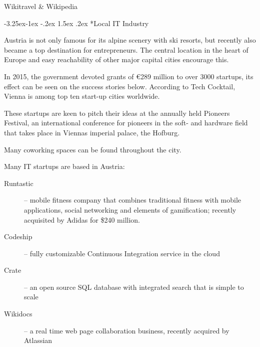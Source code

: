 \documentclass[10pt,a4paper]{article}
\makeatletter
\renewcommand\subsection{%
\@startsection{subsection}{2}{\z@}%
              {-3.25ex\@plus -1ex \@minus -.2ex}%
              {1.5ex \@plus .2ex}%
              {\color{kdelight}\sffamily\Large\bfseries}}
\makeatother
\begin{document}
\begin{flushright}Wikitravel \& Wikipedia\end{flushright}

\subsection*{Local IT Industry}
Austria is not only famous for its alpine scenery with ski resorts, but recently also became a top destination for entrepreneurs. The central location in the heart of Europe and easy reachability of other major capital cities encourage this.

In 2015, the government devoted grants of \euro 289 million to over 3000 startups, its effect can be seen on the success stories below. According to Tech Cocktail, Vienna is among top ten start-up cities worldwide.

These startups are keen to pitch their ideas at the annually held Pioneers Festival, an international conference for pioneers in the soft- and hardware field that takes place in Viennas imperial palace, the Hofburg.

Many coworking spaces can be found throughout the city.

Many IT startups are based in Austria:
\begin{description}
	\item[\color{kdedarker} Runtastic]  -- mobile fitness company that combines traditional fitness with mobile applications, social networking and elements of gamification; recently acquisited by Adidas for \$240 million.
	\item[\color{kdedarker} Codeship] -- fully customizable Continuous Integration service in the cloud
	\item[\color{kdedarker} Crate] -- an open source SQL database with integrated search that is simple to scale
	\item[\color{kdedarker} Wikidocs] -- a real time web page collaboration business, recently acquired by Atlassian
\end{description}
\end{document}
